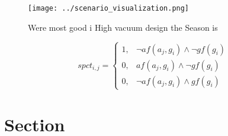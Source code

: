 \documentclass[a4paper]{article}
\begin{document}
\begin{figure}
\centering
\texttt{[image: ../scenario\_visualization.png]}
\caption{Were most good i High vacuum design the Season is
}
\end{figure}
 
\begin{equation}
spct_{i,j} =
\begin{cases}
1, & \text{$\neg af(a_j,g_i) \wedge \neg gf(g_i)$}\\
0, & \text{$af(a_j,g_i) \wedge \neg gf(g_i)$}\\
0, & \text{$\neg af(a_j,g_i) \wedge gf(g_i)$}
\end{cases}
\end{equation}

\section{Section}
\end{document}
